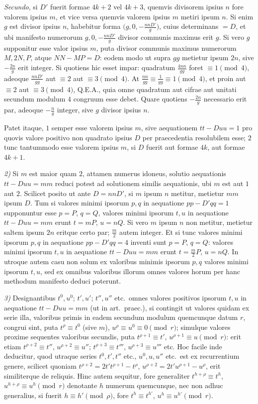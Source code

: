 \documentclass[12pt,a4paper]{article}
\theoremstyle{plain}
\theoremstyle{definition}
\theoremstyle{remark}
\begin{document}
\emph{Secundo}, si $D'$ fuerit formae $4k+2$ vel $4k+3$, quemvis divisorem ipsius $n$ fore valorem ipsius $m$, et vice versa quemvis valorem ipsius $m$ metiri ipsum $n$. Si enim $g$ est divisor ipsius $n$, habebitur forma $\bigl(g,0,-\frac{nnD'}{g}\bigr)$, cuius determinans $=D$, et ubi manifesto numerorum $g,0,-\frac{nnD'}{g}$ divisor communis maximus erit $g$. Si vero $g$ supponitur esse valor ipsius $m$, puta divisor communis maximus numerorum $M,2N,P$, atque $NN-MP=D$: eodem modo ut supra $gg$ metietur ipsum $2n$, sive $-\frac{2n}{g}$ erit integer. Si quotiens hic esset impar: quadratum $\frac{4nn}{gg}$ foret $\equiv1\pmod4$, adeoque $\frac{nnD'}{gg}$ aut $\equiv2$ aut $\equiv3\pmod4$. At $\frac{nn}{gg}\equiv\frac{1}{gg}\equiv1\pmod4$, et proin aut $\equiv2$ aut $\equiv3\pmod4$, Q.E.A., quia omne quadratum aut cifrae aut unitati secundum modulum $4$ congruum esse debet. Quare quotiens $-\frac{2n}{g}$ necessario erit par, adeoque $-\frac{n}{g}$ integer, sive $g$ divisor ipsius $n$.

Patet itaque, $1$ semper esse valorem ipsius $m$, sive aequationem $tt-Duu=1$ pro quovis valore positivo non quadrato ipsius $D$ per praecedentia resolubilem esse; $2$ tunc tantummodo esse valorem ipsius $m$, si $D$ fuerit aut formae $4k$, aut formae $4k+1$.

\emph{2)} Si $m$ est maior quam $2$, attamen numerus idoneus, solutio aequationis $tt-Duu=mm$ reduci potest ad solutionem similis aequationis, ubi $m$ est aut $1$ aut $2$. Scilicet posito ut ante $D=nnD'$, si $m$ ipsum $n$ metitur, metietur $mm$ ipsum $D$. Tum si valores minimi ipsorum $p,q$ in aequatione $pp-D'qq=1$ supponuntur esse $p=P$, $q=Q$, valores minimi ipsorum $t,u$ in aequatione $tt-Duu=mm$ erunt $t=mP$, $u=nQ$. Si vero $m$ ipsum $n$ non metitur, metietur saltem ipsum $2n$ eritque certo par; $\frac{m}{2}$ autem integer. Et si tunc valores minimi ipsorum $p,q$ in aequatione $pp-D'qq=4$ inventi sunt $p=P$, $q=Q$: valores minimi ipsorum $t,u$ in aequatione $tt-Duu=mm$ erunt $t=\frac{m}{2}P$, $u=nQ$. In utroque autem casu non solum ex valoribus minimis ipsorum $p,q$ valores minimi ipsorum $t,u$, sed ex omnibus valoribus illorum omnes valores horum per hanc methodum manifesto deduci poterunt.

\emph{3)} Designantibus $t^0,u^0$; $t',u'$; $t'',u''$ etc.\ omnes valores positivos ipsorum $t,u$ in aequatione $tt-Duu=mm$ (ut in art.\ praec.), si contingit ut valores quidam ex serie illa, valoribus primis in eadem secundum modulum quemcunque datum $r$, congrui sint, puta $t^\rho\equiv t^0$ (sive $m$), $u^\rho\equiv u^0\equiv0\pmod{r}$; simulque valores proxime sequentes valoribus secundis, puta $t^{\rho+1}\equiv t'$, $u^{\rho+1}\equiv u\pmod{r}$: erit etiam $t^{\rho+2}\equiv t''$, $u^{\rho+2}\equiv u''$; $t^{\rho+3}\equiv t'''$, $u^{\rho+3}\equiv u'''$ etc. Hoc facile inde deducitur, quod utraque series $t^0,t',t''$ etc., $u^0,u,u''$ etc.\ est ex recurrentium genere, scilicet quoniam $t^{\rho+2}=2t't^{\rho+1}-t^\rho$, $u^{\rho+2}=2t'u^{\rho+1}-u^\rho$, erit similiterque de reliquis. Hinc autem sequitur, fore generaliter $t^{h+\rho}\equiv t^h$, $u^{h+\rho}\equiv u^h\pmod{r}$ denotante $h$ numerum quemcunque, nec non adhuc generalius, si fuerit $h\equiv h'\pmod{\rho}$, fore $t^h\equiv t^{h'}$, $u^h\equiv u^{h'}\pmod{r}$.
\end{document}
